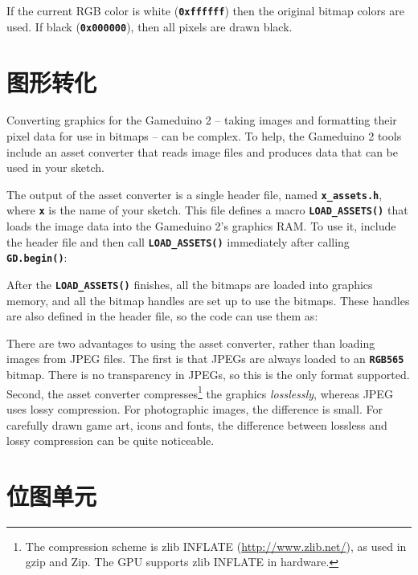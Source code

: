 \documentclass[10pt]{book}
\newcommand{\mach}[1]{\texttt{\textbf{#1}}}
\begin{document}
\begin{CJK}{UTF8}{gkai}

If the current RGB color is white (\mach{0xffffff}) then 
the original bitmap colors are used.
If black (\mach{0x000000}), then all pixels are drawn black.
\clearpage

\newpage
\section{图形转化}
\label{assets}

Converting graphics for the Gameduino 2 -- taking images and formatting their pixel data for
use in bitmaps -- can be complex.
To help, the Gameduino 2 tools include an asset converter that reads image files and produces data that can be used in your sketch.

The output of the asset converter is a single header file, named \mach{x\_assets.h}, where
\mach{x} is the name of your sketch.
This file defines
a macro \mach{LOAD\_ASSETS()} that loads the image data into the
Gameduino 2's graphics RAM.
To use it, include the header file and then call \mach{LOAD\_ASSETS()} immediately after calling \mach{GD.begin()}:


After the \mach{LOAD\_ASSETS()} finishes, all the bitmaps are loaded into graphics memory,
and all the bitmap handles are set up to use the bitmaps.
These handles are also defined in the header file, so the code can use them as:


There are two advantages to using the asset converter, rather than loading images from JPEG files.
The first is that JPEGs are always loaded to an \mach{RGB565} bitmap.
There is no transparency in JPEGs, so this is the only format supported.
Second, the asset converter compresses\footnote{
The compression scheme is zlib INFLATE
(\url{http://www.zlib.net/}), as used in gzip and Zip.
The GPU supports zlib INFLATE in hardware.
} the graphics \textit{losslessly},
whereas JPEG uses lossy compression.
For photographic images, the difference is small.
For carefully drawn game art, icons and fonts, the difference between lossless and lossy compression can be quite noticeable.

\newpage
\section{位图单元}


\end{CJK}
\end{document}
